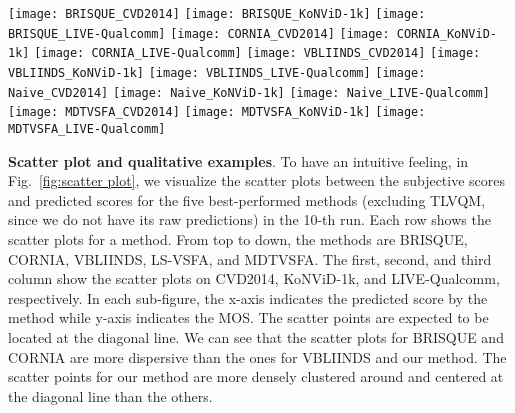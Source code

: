 \documentclass[twocolumn]{svjour3}          \smartqed  \usepackage{graphicx}
\begin{document}
\begin{figure*}
\begin{center}
 \texttt{[image: BRISQUE\_CVD2014]}
 \hfill
 \texttt{[image: BRISQUE\_KoNViD-1k]}
 \hfill
 \texttt{[image: BRISQUE\_LIVE-Qualcomm]}
 \hfill
 \texttt{[image: CORNIA\_CVD2014]}
 \hfill
 \texttt{[image: CORNIA\_KoNViD-1k]}
 \hfill
 \texttt{[image: CORNIA\_LIVE-Qualcomm]}
 \hfill
 \texttt{[image: VBLIINDS\_CVD2014]}
 \hfill
 \texttt{[image: VBLIINDS\_KoNViD-1k]}
 \hfill
 \texttt{[image: VBLIINDS\_LIVE-Qualcomm]}
 \hfill
 \texttt{[image: Naive\_CVD2014]}
 \hfill
 \texttt{[image: Naive\_KoNViD-1k]}
 \hfill
 \texttt{[image: Naive\_LIVE-Qualcomm]}
 \hfill
 \texttt{[image: MDTVSFA\_CVD2014]}
 \hfill
 \texttt{[image: MDTVSFA\_KoNViD-1k]}
 \hfill
 \texttt{[image: MDTVSFA\_LIVE-Qualcomm]}
 \hfill
\end{center}
  \caption{Scatter plots for BRISQUE, CORNIA, VBLIINDS, LS-VSFA, and MDTVSFA on CVD2014, KoNViD-1k, and LIVE-Qualcomm datasets. The predictions of MDTVSFA shows the best correlation with the mean opinion scores (MOSs) across the datasets.} 
 \label{fig:scatter plot}
\end{figure*}

\textbf{Scatter plot and qualitative examples}. 
To have an intuitive feeling, in Fig.~\ref{fig:scatter plot}, we visualize the scatter plots between the subjective scores and predicted scores for the five best-performed methods (excluding TLVQM, since we do not have its raw predictions) in the 10-th run. 
Each row shows the scatter plots for a method. 
From top to down, the methods are BRISQUE, CORNIA, VBLIINDS, LS-VSFA, and MDTVSFA. 
The first, second, and third column show the scatter plots on CVD2014, KoNViD-1k, and LIVE-Qualcomm, respectively.
In each sub-figure, the x-axis indicates the predicted score by the method while y-axis indicates the MOS. 
The scatter points are expected to be located at the diagonal line.
We can see that the scatter plots for BRISQUE and CORNIA are more dispersive than the ones for VBLIINDS and our method.
The scatter points for our method are more densely clustered around and centered at the diagonal line than the others.
\end{document}
